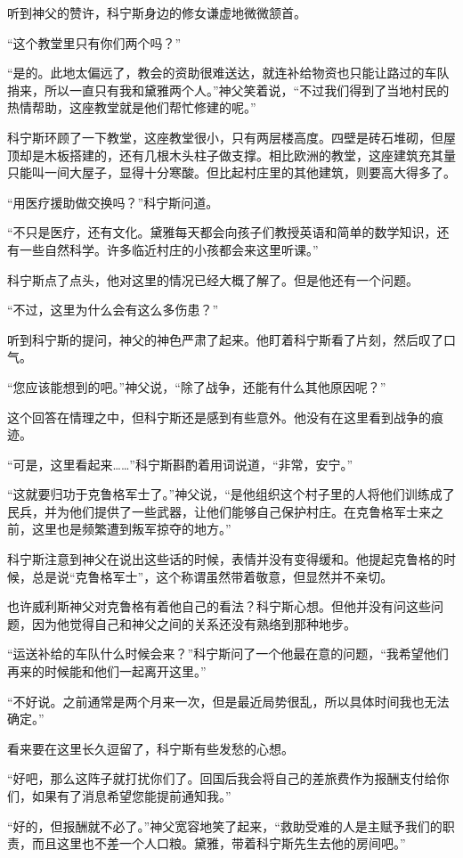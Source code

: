 听到神父的赞许，科宁斯身边的修女谦虚地微微颔首。

“这个教堂里只有你们两个吗？”

“是的。此地太偏远了，教会的资助很难送达，就连补给物资也只能让路过的车队捎来，所以一直只有我和黛雅两个人。”神父笑着说，“不过我们得到了当地村民的热情帮助，这座教堂就是他们帮忙修建的呢。”

科宁斯环顾了一下教堂，这座教堂很小，只有两层楼高度。四壁是砖石堆砌，但屋顶却是木板搭建的，还有几根木头柱子做支撑。相比欧洲的教堂，这座建筑充其量只能叫一间大屋子，显得十分寒酸。但比起村庄里的其他建筑，则要高大得多了。

“用医疗援助做交换吗？”科宁斯问道。

“不只是医疗，还有文化。黛雅每天都会向孩子们教授英语和简单的数学知识，还有一些自然科学。许多临近村庄的小孩都会来这里听课。”

科宁斯点了点头，他对这里的情况已经大概了解了。但是他还有一个问题。

“不过，这里为什么会有这么多伤患？”

听到科宁斯的提问，神父的神色严肃了起来。他盯着科宁斯看了片刻，然后叹了口气。

“您应该能想到的吧。”神父说，“除了战争，还能有什么其他原因呢？”

这个回答在情理之中，但科宁斯还是感到有些意外。他没有在这里看到战争的痕迹。

“可是，这里看起来……”科宁斯斟酌着用词说道，“非常，安宁。”

“这就要归功于克鲁格军士了。”神父说，“是他组织这个村子里的人将他们训练成了民兵，并为他们提供了一些武器，让他们能够自己保护村庄。在克鲁格军士来之前，这里也是频繁遭到叛军掠夺的地方。”

科宁斯注意到神父在说出这些话的时候，表情并没有变得缓和。他提起克鲁格的时候，总是说“克鲁格军士”，这个称谓虽然带着敬意，但显然并不亲切。

也许威利斯神父对克鲁格有着他自己的看法？科宁斯心想。但他并没有问这些问题，因为他觉得自己和神父之间的关系还没有熟络到那种地步。

“运送补给的车队什么时候会来？”科宁斯问了一个他最在意的问题，“我希望他们再来的时候能和他们一起离开这里。”

“不好说。之前通常是两个月来一次，但是最近局势很乱，所以具体时间我也无法确定。”

看来要在这里长久逗留了，科宁斯有些发愁的心想。

“好吧，那么这阵子就打扰你们了。回国后我会将自己的差旅费作为报酬支付给你们，如果有了消息希望您能提前通知我。”

“好的，但报酬就不必了。”神父宽容地笑了起来，“救助受难的人是主赋予我们的职责，而且这里也不差一个人口粮。黛雅，带着科宁斯先生去他的房间吧。”

